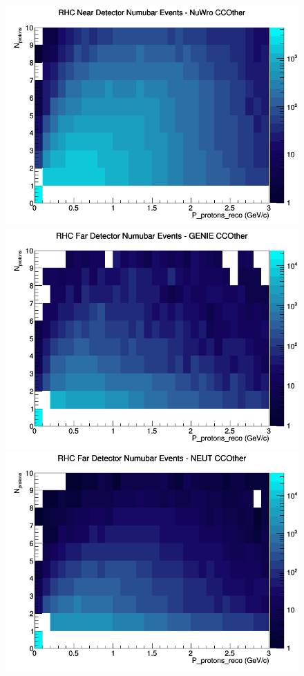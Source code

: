 \begin{figure}[h]
\includegraphics[width=\linewidth]{eff_N_P/GAr/protons/CCOther_RHC_ND_numubar_N_P_NuWro.png}
\endminipage
\newline
{}
\includegraphics[width=\linewidth]{eff_N_P/GAr/protons/CCOther_RHC_FD_numubar_N_P_GENIE.png}
\endminipage
{}
\includegraphics[width=\linewidth]{eff_N_P/GAr/protons/CCOther_RHC_FD_numubar_N_P_NEUT.png}

\end{figure}
